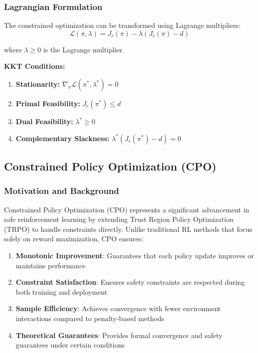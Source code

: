 \documentclass[12pt]{article}
\begin{document}
{{{{\subsubsection{Lagrangian Formulation}

The constrained optimization can be transformed using Lagrange multipliers:
\begin{equation}
\mathcal{L}(\pi, \lambda) = J_r(\pi) - \lambda(J_c(\pi) - d)
\end{equation}

where $\lambda \geq 0$ is the Lagrange multiplier.

\textbf{KKT Conditions:}
\begin{enumerate}
\item \textbf{Stationarity:} $\nabla_{\pi} \mathcal{L}(\pi^*, \lambda^*) = 0$
\item \textbf{Primal Feasibility:} $J_c(\pi^*) \leq d$
\item \textbf{Dual Feasibility:} $\lambda^* \geq 0$
\item \textbf{Complementary Slackness:} $\lambda^*(J_c(\pi^*) - d) = 0$
\end{enumerate}

\subsection{Constrained Policy Optimization (CPO)}

\subsubsection{Motivation and Background}

Constrained Policy Optimization (CPO) \cite{Achiam2017} represents a significant advancement in safe reinforcement learning by extending Trust Region Policy Optimization (TRPO) to handle constraints directly. Unlike traditional RL methods that focus solely on reward maximization, CPO ensures:

\begin{enumerate}
\item \textbf{Monotonic Improvement}: Guarantees that each policy update improves or maintains performance
\item \textbf{Constraint Satisfaction}: Ensures safety constraints are respected during both training and deployment
\item \textbf{Sample Efficiency}: Achieves convergence with fewer environment interactions compared to penalty-based methods
\item \textbf{Theoretical Guarantees}: Provides formal convergence and safety guarantees under certain conditions
\end{enumerate}

}}}}
\end{document}
